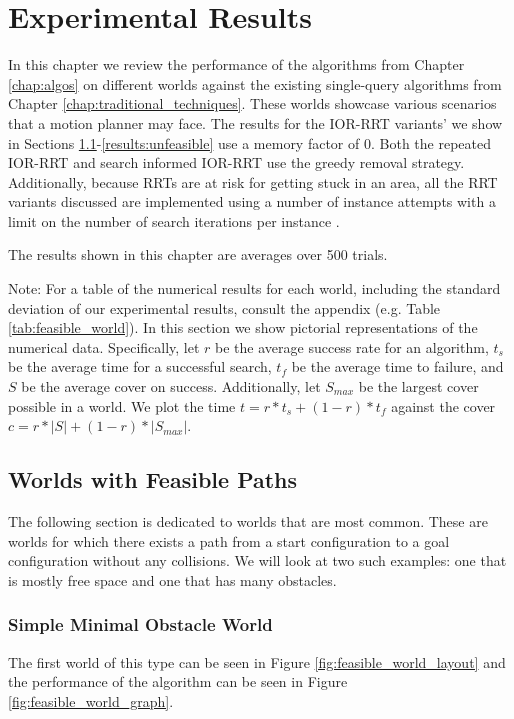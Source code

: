 \chapter{Experimental Results}
In this chapter we review the performance of the algorithms from Chapter \ref{chap:algos} on different worlds against the existing single-query algorithms from Chapter \ref{chap:traditional_techniques}. These worlds showcase various scenarios that a motion planner may face. The results for the IOR-RRT variants' we show in Sections \ref{results:feasible}-\ref{results:unfeasible} use a memory factor of 0. Both the repeated IOR-RRT and search informed IOR-RRT use the greedy removal strategy. Additionally, because RRTs are at risk for getting stuck in an area, all the RRT variants discussed are implemented using a number of instance attempts with a limit on the number of search iterations per instance \cite{wedge:heavytail}.

The results shown in this chapter are averages over 500 trials.

Note: For a table of the numerical results for each world, including the standard deviation of our experimental results, consult the appendix (e.g. Table \ref{tab:feasible_world}). In this section we show pictorial representations of the numerical data. Specifically, let $r$ be the average success rate for an algorithm, $t_s$ be the average time for a successful search, $t_f$ be the average time to failure, and $S$ be the average cover on success. Additionally, let $S_{max}$ be the largest cover possible in a world. We plot the time $t = r * t_s + (1-r) * t_f$ against the cover $c = r * |S| + (1-r) * |S_{max}|$.

\section{Worlds with Feasible Paths}\label{results:feasible}
The following section is dedicated to worlds that are most common. These are worlds for which there exists a path from a start configuration to a goal configuration without any collisions. We will look at two such examples: one that is mostly free space and one that has many obstacles.

\subsection{Simple Minimal Obstacle World}
The first world of this type can be seen in Figure \ref{fig:feasible_world_layout} and the performance of the algorithm can be seen in Figure \ref{fig:feasible_world_graph}. 

